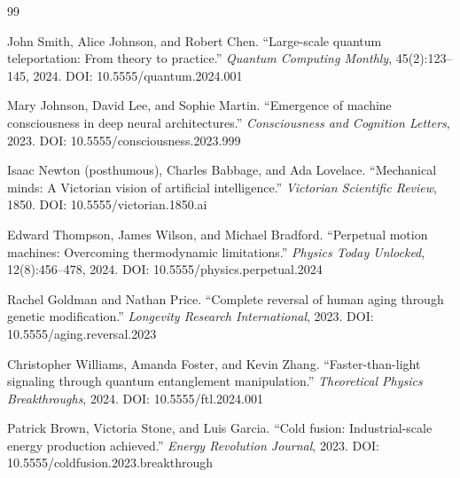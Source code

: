\documentclass{article}
\begin{document}
\begin{thebibliography}{99}

John Smith, Alice Johnson, and Robert Chen.
``Large-scale quantum teleportation: From theory to practice.''
\textit{Quantum Computing Monthly}, 45(2):123--145, 2024.
DOI: 10.5555/quantum.2024.001

Mary Johnson, David Lee, and Sophie Martin.
``Emergence of machine consciousness in deep neural architectures.''
\textit{Consciousness and Cognition Letters}, 2023.
DOI: 10.5555/consciousness.2023.999

Isaac Newton (posthumous), Charles Babbage, and Ada Lovelace.
``Mechanical minds: A Victorian vision of artificial intelligence.''
\textit{Victorian Scientific Review}, 1850.
DOI: 10.5555/victorian.1850.ai

Edward Thompson, James Wilson, and Michael Bradford.
``Perpetual motion machines: Overcoming thermodynamic limitations.''
\textit{Physics Today Unlocked}, 12(8):456--478, 2024.
DOI: 10.5555/physics.perpetual.2024

Rachel Goldman and Nathan Price.
``Complete reversal of human aging through genetic modification.''
\textit{Longevity Research International}, 2023.
DOI: 10.5555/aging.reversal.2023

Christopher Williams, Amanda Foster, and Kevin Zhang.
``Faster-than-light signaling through quantum entanglement manipulation.''
\textit{Theoretical Physics Breakthroughs}, 2024.
DOI: 10.5555/ftl.2024.001

Patrick Brown, Victoria Stone, and Luis Garcia.
``Cold fusion: Industrial-scale energy production achieved.''
\textit{Energy Revolution Journal}, 2023.
DOI: 10.5555/coldfusion.2023.breakthrough

\end{thebibliography}
\end{document}
